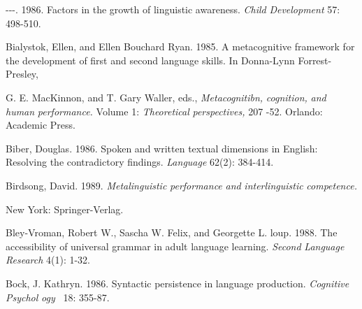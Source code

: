 \begin{styleStandard}
{}-{}-{}-. 1986. Factors in the growth of linguistic awareness. \textit{Child}\textit{ }\textit{Development}\textit{ }57: 498-510.
\end{styleStandard}


\begin{styleStandard}
Bialystok, Ellen, and Ellen Bouchard Ryan. 1985. A metacognitive framework for the development of first and second language skills. In Donna-Lynn Forrest-Presley,
\end{styleStandard}


\begin{styleStandard}
G. E. MacKinnon, and T. Gary Waller, eds., \textit{Metacognitibn,}\textit{ }\textit{cognition,}\textit{ }\textit{and}\textit{ }\textit{human}\textit{ }\textit{performance.}\textit{ }Volume 1: \textit{Theoretical}\textit{ }\textit{perspectives,}\textit{ }207 {}-52. Orlando: Academic Press.
\end{styleStandard}


\begin{styleStandard}
Biber, Douglas. 1986. Spoken and written textual dimensions in English: Resolving the contradictory findings. \textit{Language}\textit{ }62(2): 384-414.
\end{styleStandard}


\begin{styleStandard}
Birdsong, David. 1989. \textit{Metalinguistic}\textit{ }\textit{performance}\textit{ }\textit{and}\textit{ }\textit{interlinguistic}\textit{ }\textit{competence.}
\end{styleStandard}


\begin{styleStandard}
New York: Springer-Verlag.
\end{styleStandard}


\begin{styleStandard}
Bley-Vroman, Robert W., Sascha W. Felix, and Georgette L. loup. 1988. The accessibility of universal grammar in adult language learning. \textit{Second}\textit{ }\textit{Language}\textit{ }\textit{Research}\textit{ }4(1): 1-32.
\end{styleStandard}


\begin{styleStandard}
Bock, J. Kathryn. 1986. Syntactic persistence in language production. \textit{Cognitive}\textit{ }\textit{Psychol\-}\textit{ }\textit{ogy }\textit{\ }18: 355-87.
\end{styleStandard}


